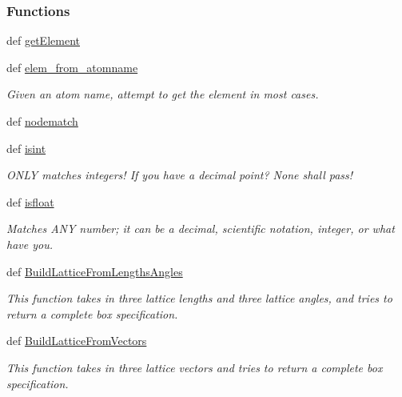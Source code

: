 \subsubsection*{Functions}
\begin{DoxyCompactItemize}
\item 
def \hyperlink{namespaceforcebalance_1_1molecule_af28de4693e5b8e82df900d0ac3c6c370}{get\-Element}
\item 
def \hyperlink{namespaceforcebalance_1_1molecule_a7429f0c377d6396711c128f6590ef810}{elem\-\_\-from\-\_\-atomname}
\begin{DoxyCompactList}\small\item\em Given an atom name, attempt to get the element in most cases. \end{DoxyCompactList}\item 
def \hyperlink{namespaceforcebalance_1_1molecule_ab8464fea13fad2a506792c2f1d7c93f3}{nodematch}
\item 
def \hyperlink{namespaceforcebalance_1_1molecule_a0dd31eff88d2bed0884ab21a13261d42}{isint}
\begin{DoxyCompactList}\small\item\em O\-N\-L\-Y matches integers! If you have a decimal point? None shall pass! \end{DoxyCompactList}\item 
def \hyperlink{namespaceforcebalance_1_1molecule_afe989ffd119568047fc8265b1d329a70}{isfloat}
\begin{DoxyCompactList}\small\item\em Matches A\-N\-Y number; it can be a decimal, scientific notation, integer, or what have you. \end{DoxyCompactList}\item 
def \hyperlink{namespaceforcebalance_1_1molecule_a0a6e3e79b04534bf2e83d09def189444}{Build\-Lattice\-From\-Lengths\-Angles}
\begin{DoxyCompactList}\small\item\em This function takes in three lattice lengths and three lattice angles, and tries to return a complete box specification. \end{DoxyCompactList}\item 
def \hyperlink{namespaceforcebalance_1_1molecule_a29fb1ac9324f4280f07c65baea339989}{Build\-Lattice\-From\-Vectors}
\begin{DoxyCompactList}\small\item\em This function takes in three lattice vectors and tries to return a complete box specification. \end{DoxyCompactList}\item 

\end{DoxyCompactItemize}
